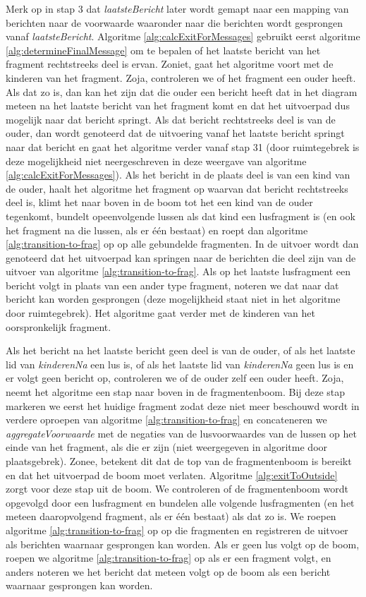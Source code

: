 Merk op in stap 3 dat \textit{laatsteBericht} later wordt gemapt naar een mapping van berichten naar de voorwaarde waaronder naar die berichten wordt gesprongen vanaf \textit{laatsteBericht}.
Algoritme \ref{alg:calcExitForMessages} gebruikt eerst algoritme \ref{alg:determineFinalMessage} om te bepalen of het laatste bericht van het fragment rechtstreeks deel is ervan. Zoniet, gaat het algoritme voort met de kinderen van het fragment. Zoja, controleren we of het fragment een ouder heeft. Als dat zo is, dan kan het zijn dat die ouder een bericht heeft dat in het diagram meteen na het laatste bericht van het fragment komt en dat het uitvoerpad dus mogelijk naar dat bericht springt. Als dat bericht rechtstreeks deel is van de ouder, dan wordt genoteerd dat de uitvoering vanaf het laatste bericht springt naar dat bericht en gaat het algoritme verder vanaf stap 31 (door ruimtegebrek is deze mogelijkheid niet neergeschreven in deze weergave van algoritme \ref{alg:calcExitForMessages}). Als het bericht in de plaats deel is van een kind van de ouder, haalt het algoritme het fragment op waarvan dat bericht rechtstreeks deel is, klimt het naar boven in de boom tot het een kind van de ouder tegenkomt, bundelt opeenvolgende lussen als dat kind een lusfragment is (en ook het fragment na die lussen, als er \'e\'en bestaat) en roept dan algoritme \ref{alg:transition-to-frag} op op alle gebundelde fragmenten. In de uitvoer wordt dan genoteerd dat het uitvoerpad kan springen naar de berichten die deel zijn van de uitvoer van algoritme \ref{alg:transition-to-frag}. Als op het laatste lusfragment een bericht volgt in plaats van een ander type fragment, noteren we dat naar dat bericht kan worden gesprongen (deze mogelijkheid staat niet in het algoritme door ruimtegebrek). Het algoritme gaat verder met de kinderen van het oorspronkelijk fragment.

Als het bericht na het laatste bericht geen deel is van de ouder, of als het laatste lid van \textit{kinderenNa} een lus is, of als het laatste lid van \textit{kinderenNa} geen lus is en er volgt geen bericht op, controleren we of de ouder zelf een ouder heeft. Zoja, neemt het algoritme een stap naar boven in de fragmentenboom. Bij deze stap markeren we eerst het huidige fragment zodat deze niet meer beschouwd wordt in verdere oproepen van algoritme \ref{alg:transition-to-frag} en concateneren we \textit{aggregateVoorwaarde} met de negaties van de lusvoorwaardes van de lussen op het einde van het fragment, als die er zijn (niet weergegeven in algoritme door plaatsgebrek). Zonee, betekent dit dat de top van de fragmentenboom is bereikt en dat het uitvoerpad de boom moet verlaten. Algoritme \ref{alg:exitToOutside} zorgt voor deze stap uit de boom. We controleren of de fragmentenboom wordt opgevolgd door een lusfragment en bundelen alle volgende lusfragmenten (en het meteen daaropvolgend fragment, als er \'e\'en bestaat) als dat zo is. We roepen algoritme \ref{alg:transition-to-frag} op op die fragmenten en registreren de uitvoer als berichten waarnaar gesprongen kan worden. Als er geen lus volgt op de boom, roepen we algoritme \ref{alg:transition-to-frag} op als er een fragment volgt, en anders noteren we het bericht dat meteen volgt op de boom als een bericht waarnaar gesprongen kan worden.

